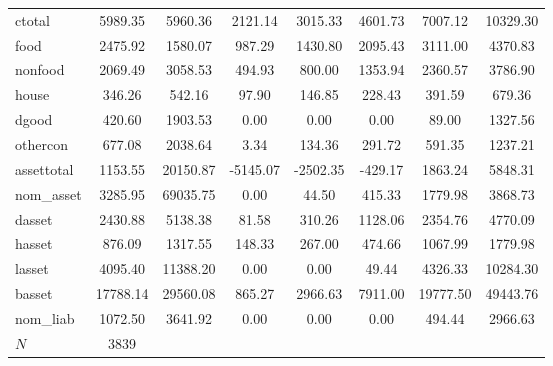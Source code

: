 {\begin{tabular}{l*{1}{ccccccc}}
ctotal      &     5989.35&     5960.36&     2121.14&     3015.33&     4601.73&     7007.12&    10329.30\\
food        &     2475.92&     1580.07&      987.29&     1430.80&     2095.43&     3111.00&     4370.83\\
nonfood     &     2069.49&     3058.53&      494.93&      800.00&     1353.94&     2360.57&     3786.90\\
house       &      346.26&      542.16&       97.90&      146.85&      228.43&      391.59&      679.36\\
dgood       &      420.60&     1903.53&        0.00&        0.00&        0.00&       89.00&     1327.56\\
othercon    &      677.08&     2038.64&        3.34&      134.36&      291.72&      591.35&     1237.21\\
assettotal  &     1153.55&    20150.87&    -5145.07&    -2502.35&     -429.17&     1863.24&     5848.31\\
nom\_asset   &     3285.95&    69035.75&        0.00&       44.50&      415.33&     1779.98&     3868.73\\
dasset      &     2430.88&     5138.38&       81.58&      310.26&     1128.06&     2354.76&     4770.09\\
hasset      &      876.09&     1317.55&      148.33&      267.00&      474.66&     1067.99&     1779.98\\
lasset      &     4095.40&    11388.20&        0.00&        0.00&       49.44&     4326.33&    10284.30\\
basset      &    17788.14&    29560.08&      865.27&     2966.63&     7911.00&    19777.50&    49443.76\\
nom\_liab    &     1072.50&     3641.92&        0.00&        0.00&        0.00&      494.44&     2966.63\\
\hline
\(N\)       &        3839&            &            &            &            &            &            \\
\hline\hline
\end{tabular}
}
